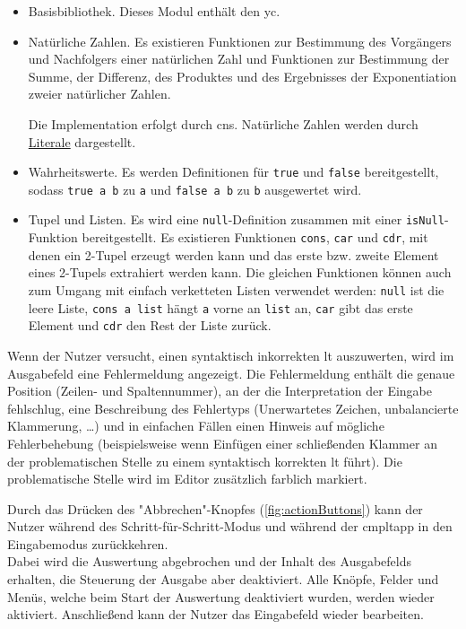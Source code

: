 \documentclass[parskip=full,11pt,twoside]{scrartcl}
\begin{document}
\begin{itemize}
	\item Basisbibliothek. Dieses Modul enthält den \gls{yc}.
	
	\item Natürliche Zahlen. Es existieren Funktionen zur Bestimmung des Vorgängers
	und Nachfolgers einer natürlichen Zahl und Funktionen zur Bestimmung der Summe,
	der Differenz, des Produktes und des Ergebnisses der Exponentiation zweier
	natürlicher Zahlen.
	
	Die Implementation erfolgt durch \glspl{cn}. Natürliche Zahlen werden durch \hyperref[fnc:lit]{Literale} dargestellt.
	
	\item Wahrheitswerte. Es werden Definitionen für \texttt{true} und \texttt{false}
	bereitgestellt, sodass \texttt{true a b} zu \texttt{a} und \texttt{false a b}
	zu \texttt{b} ausgewertet wird.
	
	\item Tupel und Listen. Es wird eine \texttt{null}-Definition zusammen mit einer
	\texttt{isNull}-Funktion bereitgestellt. Es existieren Funktionen
	\texttt{cons}, \texttt{car} und \texttt{cdr}, %
	mit denen ein 2-Tupel erzeugt werden kann und das erste bzw. zweite Element
	eines 2-Tupels extrahiert werden kann. Die gleichen Funktionen können auch zum
	Umgang mit einfach verketteten Listen verwendet werden: \texttt{null} ist die
	leere Liste, \texttt{cons a list} hängt \texttt{a} vorne an \texttt{list} an,
	\texttt{car} gibt das erste Element und \texttt{cdr} den Rest der Liste zurück.
\end{itemize}

Wenn der Nutzer versucht, einen syntaktisch inkorrekten \gls{lt} auszuwerten,
wird im Ausgabefeld eine Fehlermeldung angezeigt. Die Fehlermeldung enthält die genaue Position (Zeilen-
und Spaltennummer), an der die Interpretation der Eingabe fehlschlug, eine Beschreibung
des Fehlertyps (Unerwartetes Zeichen, unbalancierte Klammerung, \ldots) und in einfachen
Fällen einen Hinweis auf mögliche Fehlerbehebung (beispielsweise wenn Einfügen einer
schließenden Klammer an der problematischen Stelle zu einem syntaktisch korrekten
\gls{lt} führt).
Die problematische Stelle wird im Editor zusätzlich farblich markiert.

Durch das Drücken des "Abbrechen"-Knopfes (\cref{fig:actionButtons}) kann der Nutzer während des Schritt-für-Schritt-Modus und während der \gls{cmpltapp} in den Eingabemodus zurückkehren.\\
Dabei wird die Auswertung abgebrochen und der Inhalt des Ausgabefelds erhalten, die Steuerung der Ausgabe aber deaktiviert.
Alle Knöpfe, Felder und Menüs, welche beim Start der Auswertung deaktiviert wurden, werden wieder aktiviert.
Anschließend kann der Nutzer das Eingabefeld wieder bearbeiten.
\end{document}
